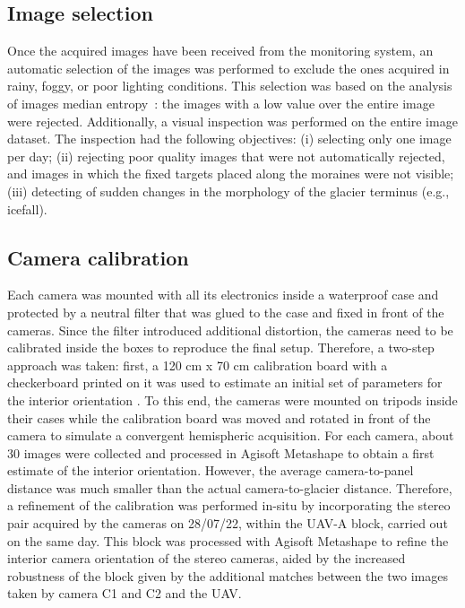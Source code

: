 \subsection{Image selection}\label{sec:4:imageselection}

Once the acquired images have been received from the monitoring system, an
automatic selection of the images was performed to exclude the ones acquired in rainy,
foggy, or poor lighting conditions.
This selection was based on the analysis of images median
entropy~\citep{tsai2008entropy}:
the images with a low value over the entire image were rejected.
Additionally, a visual inspection was performed on the entire image dataset.
The inspection had the following objectives:
(i) selecting only one image per day;
(ii) rejecting poor quality images that were not automatically rejected,
and images in which the fixed targets placed along the moraines were not visible;
(iii) detecting of sudden changes in the morphology of the glacier
terminus (e.g., icefall).

\subsection{Camera calibration}\label{sec:4:cameracalibration}

Each camera was mounted with all its electronics inside a waterproof case and protected
by a neutral filter that was glued to the case and fixed in front of the cameras.
Since the filter introduced additional distortion, the cameras need to be calibrated
inside the boxes to reproduce the final setup.
Therefore, a two-step approach was taken: first, a 120 cm x 70 cm calibration board with
a checkerboard printed on it was used to estimate an initial set of parameters for the
interior orientation \citep{zhang_flexible_2000}.
To this end, the cameras were mounted on tripods inside their cases while the calibration
board was moved and rotated in front of the camera to simulate a convergent hemispheric
acquisition.
For each camera, about 30 images were collected and processed in Agisoft Metashape to
obtain a first estimate of the interior orientation.
However, the average camera-to-panel distance was much smaller than the actual
camera-to-glacier distance.
Therefore, a refinement of the calibration was performed in-situ by incorporating the
stereo pair acquired by the cameras on 28/07/22, within the UAV-A block, carried out on
the same day.
This block was processed with Agisoft Metashape to refine the interior camera
orientation of the stereo cameras, aided by the increased robustness of the block given
by the additional matches between the two images taken by camera C1 and C2 and the UAV.

